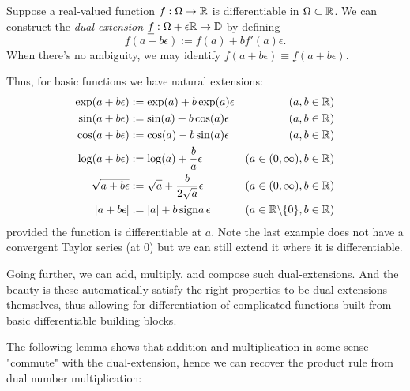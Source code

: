 \begin{definition} Suppose a real-valued function $f : \Omega \rightarrow {\mathbb R}$ is differentiable in $\Omega \subset {\mathbb R}$.  We can construct the \emph{dual extension} $\underline{f} : \Omega + \epsilon{\mathbb R} \rightarrow {\mathbb D}$ by defining
\[
\underline{f}(a + b \ensuremath{\epsilon}) := f(a) + b f'(a) \ensuremath{\epsilon}.
\]
When there's no ambiguity, we may identify $f(a + b \ensuremath{\epsilon}) \ensuremath{\equiv} \underline{f}(a+b \ensuremath{\epsilon})$.

Thus, for basic functions we have natural extensions:
\begin{align*}
\exp(a + b \epsilon) &:= \exp(a) + b \exp(a) \epsilon & (a,b \in {\mathbb R}) \\
\sin(a + b \epsilon) &:= \sin(a) + b \cos(a) \epsilon & (a,b \in {\mathbb R}) \\
\cos(a + b \epsilon) &:= \cos(a) - b \sin(a) \epsilon & (a,b \in {\mathbb R}) \\
\log(a + b \epsilon) &:= \log(a) + {b \over a} \epsilon & (a \in (0,\infty), b \in {\mathbb R}) \\
\sqrt{a+b \epsilon} &:= \sqrt{a} + {b \over 2 \sqrt{a}} \epsilon & (a \in (0,\infty), b \in {\mathbb R}) \\
|a + b \epsilon| &:= |a| + b\, {\rm sign} a\, \epsilon & (a \in {\mathbb R} \backslash \{0\} , b \in {\mathbb R})
\end{align*}
provided the function is differentiable at $a$. Note the last example does not have a convergent Taylor series (at $0$) but we can still extend it where it is differentiable.

Going further, we can add, multiply, and compose such dual-extensions. And the beauty is these automatically satisfy the right properties to be dual-extensions themselves, thus allowing for differentiation of  complicated functions built from basic differentiable building blocks.

The following lemma shows that addition and multiplication in some sense "commute" with the dual-extension, hence we can recover the product rule from dual number multiplication:


\end{definition}
